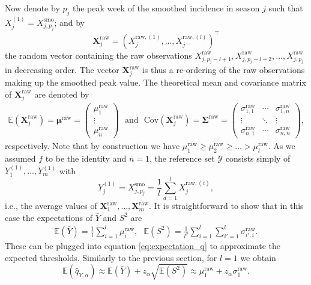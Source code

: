 \documentclass{article}
\begin{document}
Now denote by $p_j$ the peak week of the smoothed incidence in season $j$ such that $X_j^{(1)} = X^{\text{smo}}_{j, p_j}$; and by
$$
\mathbf{X}^\text{raw}_j = (X_j^{\text{raw}, (1)}, \dots, X_j^{\text{raw}, (l)})^\top
$$
the random vector containing the raw observations $X^\text{raw}_{j, p_j - l + 1}, X^\text{raw}_{j, p_j - l + 2}, \dots, X^\text{raw}_{j, p_j}$ in decreasing order. The vector $\mathbf{X}^\text{raw}_j$ is thus a re-ordering of the raw observations making up the smoothed peak value. The theoretical mean and covariance matrix of $\mathbf{X}^\text{raw}_j$ are denoted by
\begin{align}
\mathbb{E}\left(\mathbf{X}^\text{raw}_j\right) = \boldsymbol{\mu}^\text{raw} = \left(\begin{array}{c}
\mu^\text{raw}_1\\
\vdots\\
\mu^\text{raw}_n
\end{array}\right) \ \ \ \text{and} \ \ \ \text{Cov}\left(\mathbf{X}^\text{raw}_j\right) = \boldsymbol{\Sigma}^\text{raw} =
\left(\begin{array}{ccc}
\sigma^\text{raw}_{1, 1} & \cdots & \sigma^\text{raw}_{1, n}\\
\vdots & \ddots &\vdots\\
\sigma^\text{raw}_{n, 1} & \cdots & \sigma^\text{raw}_{n, n}
\end{array}\right),
\end{align}
respectively. Note that by construction we have $\mu^\text{raw}_1 \geq \mu^\text{raw}_2 \geq \dots > \mu^\text{raw}_l$. As we assumed $f$ to be the identity and $n = 1$, the reference set $\mathcal{Y}$ consists simply of $Y^{(1)}_1, \dots, Y^{(1)}_m$ with
$$
Y^{(1)}_j = X^{\text{smo}}_{j, p_j} = \frac{1}{l} \sum_{d = 1}^l X^{\text{raw}, (i)}_{j},
$$
i.e., the average values of $\mathbf{X}^\text{raw}_{1}, \dots, \mathbf{X}^\text{raw}_{m}$. It is straightforward to show that in this case the expectations of $\bar{Y}$ and $S^2$ are
\begin{align}
\mathbb{E}(\bar{Y}) = \frac{1}{l} \sum_{i = 1}^l \mu^\text{raw}_i, \ \ \ 
\mathbb{E}(S^2) = \frac{1}{l^2} \sum_{i = 1}^l \sum_{i' = 1}^l \sigma^\text{raw}_{i', i}.
\label{eq:expectation_moments_smoothing}
\end{align}
These can be plugged into equation \eqref{eq:expectation_q} to approximate the expected thresholds. Similarly to the previous section, for $l = 1$ we obtain
\begin{equation}
\mathbb{E}(\hat{q}_{Y, \alpha}) \approx \mathbb{E}(\bar{Y}) + z_\alpha \sqrt{\mathbb{E}(S^2)} \approx \mu^\text{raw}_1 + z_\alpha \sigma^\text{raw}_1.
\label{eq:expected_threshold_smooth}
\end{equation}
\end{document}
